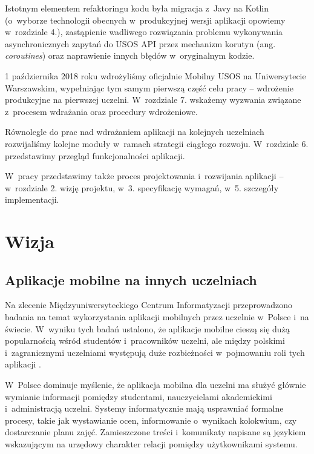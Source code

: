 \documentclass{pracamgr}
\begin{document}
Istotnym elementem refaktoringu kodu była migracja z~Javy na Kotlin (o~wyborze technologii obecnych w~produkcyjnej wersji
aplikacji opowiemy w~rozdziale 4.), zastąpienie wadliwego rozwiązania problemu
wykonywania asynchronicznych zapytań do USOS API przez mechanizm korutyn 
(ang. \textit{coroutines}) oraz naprawienie innych błędów w~oryginalnym kodzie.

1 października 2018 roku wdrożyliśmy oficjalnie Mobilny USOS na Uniwersytecie Warszawskim,
wypełniając tym samym pierwszą część celu pracy -- wdrożenie produkcyjne na pierwszej uczelni.
W~rozdziale 7. wskażemy wyzwania związane z~procesem wdrażania oraz procedury wdrożeniowe.

Równolegle do prac nad wdrażaniem aplikacji na kolejnych uczelniach rozwijaliśmy kolejne
moduły w~ramach strategii ciągłego rozwoju. W~rozdziale 6. przedstawimy przegląd
funkcjonalności aplikacji.

W~pracy przedstawimy także proces projektowania i~rozwijania aplikacji -- w~rozdziale 2.
wizję projektu, w~3. specyfikację wymagań, w~5. szczegóły implementacji.


\chapter{Wizja}

\section{Aplikacje mobilne na innych uczelniach}

Na zlecenie Międzyuniwersyteckiego Centrum Informatyzacji \cite{muci} przeprowadzono
badania na temat wykorzystania aplikacji mobilnych przez uczelnie w~Polsce i~na świecie. W~wyniku tych badań ustalono, że aplikacje mobilne
cieszą się dużą popularnością wśród studentów i~pracowników uczelni, ale
między polskimi i~zagranicznymi uczelniami występują duże rozbieżności w~pojmowaniu
roli tych aplikacji \cite{przegladaplikacji}.

W~Polsce dominuje myślenie, że aplikacja mobilna dla uczelni ma służyć głównie
wymianie informacji pomiędzy studentami, nauczycielami akademickimi i~administracją
uczelni. Systemy informatycznie mają usprawniać formalne procesy, takie jak
wystawianie ocen, informowanie o~wynikach kolokwium, czy dostarczanie 
planu zajęć. Zamieszczone treści i~komunikaty napisane są językiem wskazującym na
urzędowy charakter relacji pomiędzy użytkownikami systemu.
\end{document}
